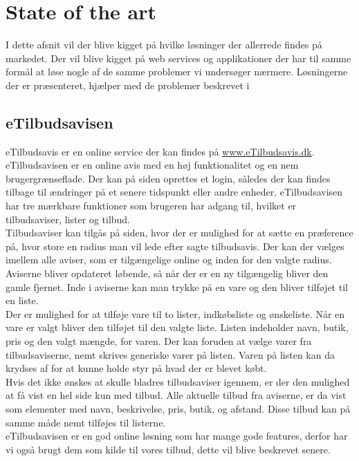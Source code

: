 \chapter{State of the art}
I dette afsnit vil der blive kigget på hvilke løsninger der allerrede findes på markedet.
Der vil blive kigget på web services og applikationer der har til samme formål at løse nogle af de samme problemer vi undersøger nærmere.
Løsningerne der er præsenteret, hjælper med de problemer beskrevet i 
\section{eTilbudsavisen}
eTilbudsavis er en online service der kan findes på \underline{www.eTilbudsavis.dk}. eTilbudsavisen er en online avis med en høj funktionalitet og en nem brugergrænseflade.
Der kan på siden oprettes et login, således der kan findes tilbage til ændringer på et senere tidspunkt eller andre enheder.
eTilbudsavisen har tre mærkbare funktioner som brugeren har adgang til, hvilket er tilbudsaviser, lister og tilbud.\\
Tilbudsaviser kan tilgås på siden, hvor der er mulighed for at sætte en præference på, hvor store en radius man vil lede efter sagte tilbudsavis. 
Der kan der vælges imellem alle aviser, som er tilgængelige online og inden for den valgte radius. 
Aviserne bliver opdateret løbende, så når der er en ny tilgængelig bliver den gamle fjernet. 
Inde i aviserne kan man trykke på en vare og den bliver tilføjet til en liste.\\
Der er mulighed for at tilføje vare til to lister, indkøbsliste og ønskeliste. 
Når en vare er valgt bliver den tilføjet til den valgte liste.
Listen indeholder navn, butik, pris og den valgt mængde, for varen. 
Der kan foruden at vælge varer fra tilbudsaviserne, nemt skrives generiske varer på listen. Varen på listen kan da krydses af for at kunne holde styr på hvad der er blevet købt.\\ 
Hvis det ikke ønskes at skulle bladres tilbudsaviser igennem, er der den mulighed at få vist en hel side kun med tilbud. 
Alle aktuelle tilbud fra aviserne, er da vist som elementer med navn, beskrivelse, pris, butik, og afstand. Disse tilbud kan på samme måde nemt tilføjes til listerne.\\
eTilbudsavisen er en god online løsning som har mange gode features, derfor har vi også brugt dem som kilde til vores tilbud, dette vil blive beskrevet senere.

